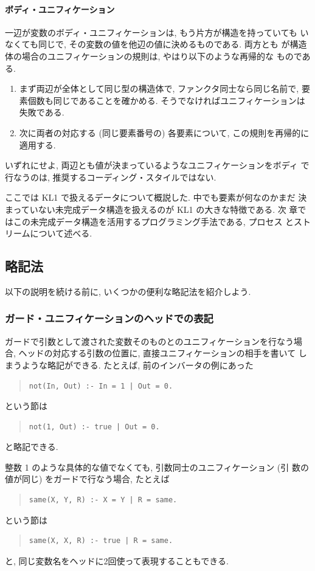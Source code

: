 \documentclass[a4,titlepage]{jsreport}
\newenvironment{program}{\begin{quote}}{\end{quote}}
\begin{document}
\paragraph{ボディ・ユニフィケーション}
一辺が変数のボディ・ユニフィケーションは, もう片方が構造を持っていても
いなくても同じで, その変数の値を他辺の値に決めるものである.  両方とも
が構造体の場合のユニフィケーションの規則は, やはり以下のような再帰的な
ものである.
\begin{enumerate}
\item
まず両辺が全体として同じ型の構造体で, ファンクタ同士なら同じ名前で, 要
素個数も同じであることを確かめる.  そうでなければユニフィケーションは
失敗である.
\item
次に両者の対応する (同じ要素番号の) 各要素について, この規則を再帰的に
適用する.
\end{enumerate}
いずれにせよ, 両辺とも値が決まっているようなユニフィケーションをボディ
で行なうのは, 推奨するコーディング・スタイルではない.

ここでは KL1 で扱えるデータについて概説した.  中でも要素が何なのかまだ
決まっていない未完成データ構造を扱えるのが KL1 の大きな特徴である.  次
章ではこの未完成データ構造を活用するプログラミング手法である, プロセス
とストリームについて述べる.

\subsection{略記法}
以下の説明を続ける前に, いくつかの便利な略記法を紹介しよう.

\subsubsection{ガード・ユニフィケーションのヘッドでの表記}
ガードで引数として渡された変数そのものとのユニフィケーションを行なう場
合, ヘッドの対応する引数の位置に, 直接ユニフィケーションの相手を書いて
しまうような略記ができる.  たとえば, 前のインバータの例にあった
\begin{program}
\begin{verbatim}
not(In, Out) :- In = 1 | Out = 0.
\end{verbatim}
\end{program}
という節は
\begin{program}
\begin{verbatim}
not(1, Out) :- true | Out = 0.
\end{verbatim}
\end{program}
と略記できる.

整数 1 のような具体的な値でなくても, 引数同士のユニフィケーション (引
数の値が同じ) をガードで行なう場合, たとえば
\begin{program}
\begin{verbatim}
same(X, Y, R) :- X = Y | R = same.
\end{verbatim}
\end{program}
という節は
\begin{program}
\begin{verbatim}
same(X, X, R) :- true | R = same.
\end{verbatim}
\end{program}
と, 同じ変数名をヘッドに2回使って表現することもできる.
\end{document}

